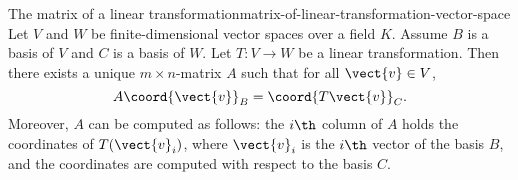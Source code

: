 \begin{proposition}{The matrix of a linear transformation}{matrix-of-linear-transformation-vector-space}
  Let $V$ and $W$ be finite-dimensional vector spaces over a field
  $K$. Assume $B$ is a basis of $V$ and $C$ is a basis of $W$.  Let
  $T:V\to W$ be a linear transformation. Then there exists a unique
  $m\times n$-matrix $A$ such that for all $\vect{v}\in V$,
  \begin{equation*}
    A\coord{\vect{v}}_B = \coord{T\vect{v}}_C.
  \end{equation*}
  Moreover, $A$ can be computed as follows: the $i\th$ column of $A$
  holds the coordinates of $T(\vect{v}_i)$, where $\vect{v}_i$ is the
  $i\th$ vector of the basis $B$, and the coordinates are computed
  with respect to the basis $C$.
\end{proposition}

